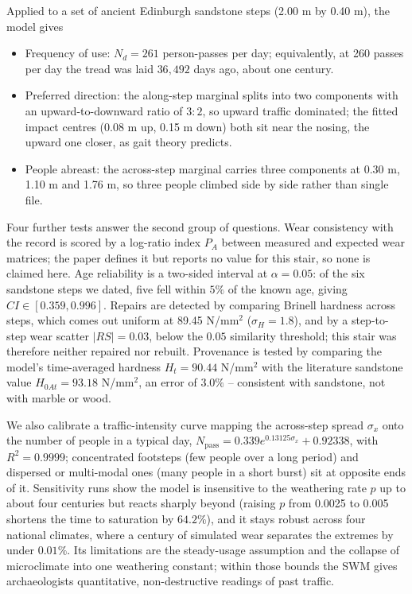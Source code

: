 \documentclass[12pt]{article}
\begin{document}
Applied to a set of ancient Edinburgh sandstone steps (2.00 m by 0.40 m), the model gives
\begin{itemize}
\setlength{\itemsep}{0pt}
\setlength{\parskip}{0pt}
\setlength{\topsep}{2pt}
\item Frequency of use: $N_d = 261$ person-passes per day; equivalently, at 260 passes
per day the tread was laid $36{,}492$ days ago, about one century.
\item Preferred direction: the along-step marginal splits into two components with an
upward-to-downward ratio of $3:2$, so upward traffic dominated; the fitted impact centres
(0.08 m up, 0.15 m down) both sit near the nosing, the upward one closer, as gait theory
predicts.
\item People abreast: the across-step marginal carries three components at 0.30 m, 1.10 m
and 1.76 m, so three people climbed side by side rather than single file.
\end{itemize}

Four further tests answer the second group of questions. Wear consistency with the record
is scored by a log-ratio index $P_A$ between measured and expected wear matrices; the
paper defines it but reports no value for this stair, so none is claimed here. Age
reliability is a two-sided interval at $\alpha = 0.05$: of the six sandstone steps we
dated, five fell within $5\%$ of the known age, giving $CI \in [0.359, 0.996]$. Repairs
are detected by comparing Brinell hardness across steps, which comes out uniform at 89.45
N/mm$^2$ ($\sigma_H = 1.8$), and by a step-to-step wear scatter $|RS| = 0.03$, below the
$0.05$ similarity threshold; this stair was therefore neither repaired nor rebuilt.
Provenance is tested by comparing the model's time-averaged hardness $H_t = 90.44$
N/mm$^2$ with the literature sandstone value $H_{0At} = 93.18$ N/mm$^2$, an error of
$3.0\%$ -- consistent with sandstone, not with marble or wood.

We also calibrate a traffic-intensity curve mapping the across-step spread $\sigma_x$ onto
the number of people in a typical day,
$N_{\mathrm{pass}} = 0.339 e^{0.13125\sigma_x} + 0.92338$, with $R^2 = 0.9999$;
concentrated footsteps (few people over a long period) and dispersed or multi-modal ones
(many people in a short burst) sit at opposite ends of it. Sensitivity runs show the model
is insensitive to the weathering rate $p$ up to about four centuries but reacts sharply
beyond (raising $p$ from 0.0025 to 0.005 shortens the time to saturation by $64.2\%$), and
it stays robust across four national climates, where a century of simulated wear separates
the extremes by under $0.01\%$. Its limitations are the steady-usage assumption and the
collapse of microclimate into one weathering constant; within those bounds the SWM gives
archaeologists quantitative, non-destructive readings of past traffic.


\end{document}

